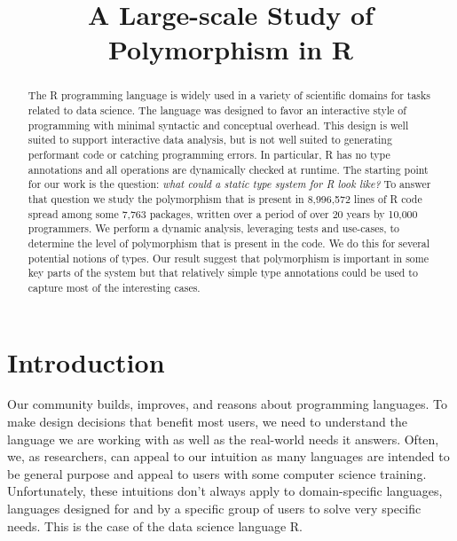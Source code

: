\documentclass[acmsmall,10pt,review,anonymous]{acmart}\settopmatter{printfolios=true,printccs=false,printacmref=false}
\begin{document}
\title{A Large-scale Study of Polymorphism in R}

\newcommand{\PACKAGES}{7,763\xspace}
\newcommand{\PROGRAMMERS}{10,000\xspace}
\newcommand{\PERCENTCRAN}{56\%\xspace}
\newcommand{\CRANTOTAL}{13,841\xspace}
\newcommand{\RLOC}{8,996,572\xspace}
\newcommand{\CLOC}{5,100,719\xspace}
\newcommand{\YEARS}{20\xspace}

\begin{abstract}
The R programming language is widely used in a variety of scientific domains
for tasks related to data science. The language was designed to favor an
interactive style of programming with minimal syntactic and conceptual
overhead. This design is well suited to support interactive data analysis,
but is not well suited to generating performant code or catching programming
errors.  In particular, R has no type annotations and all operations are
dynamically checked at runtime. The starting point for our work is the
question: \emph{what could a static type system for R look like?}  To answer
that question we study the polymorphism that is present in \RLOC lines of R 
code spread among some \PACKAGES packages, written over a
period of over \YEARS years by \PROGRAMMERS programmers.  We perform a dynamic
analysis, leveraging tests and use-cases, to determine the level of
polymorphism that is present in the code. We do this for several potential
notions of types. Our result suggest that polymorphism is important in some
key parts of the system but that relatively simple type annotations could be
used to capture most of the interesting cases.
\end{abstract}

\maketitle

\section{Introduction}

Our community builds, improves, and reasons about programming languages.  To
make design decisions that benefit most users, we need to understand the
language we are working with as well as the real-world needs it
answers. Often, we, as researchers, can appeal to our intuition as many
languages are intended to be general purpose and appeal to users with some
computer science training. Unfortunately, these intuitions don't always
apply to domain-specific languages, languages designed for and by a specific
group of users to solve very specific needs. This is the case of the data
science language R.
\end{document}
